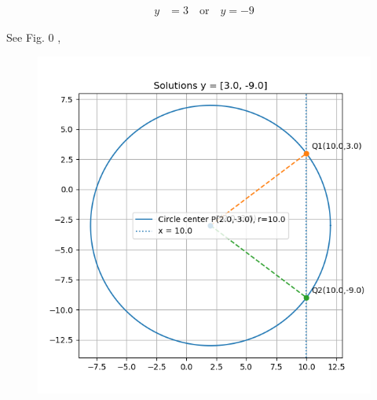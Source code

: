 \documentclass[journal]{IEEEtran}
\begin{document}
\begin{align}
y &= 3 \quad \text{or} \quad y = -9
\end{align}

\newpage
See Fig. 0 ,
\begin{figure}[H]
\begin{center}
\includegraphics[width=0.6\columnwidth]{figs/fig.png}
\end{center}
\caption{}
\label{fig:Fig1}
\end{figure}
\end{document}
